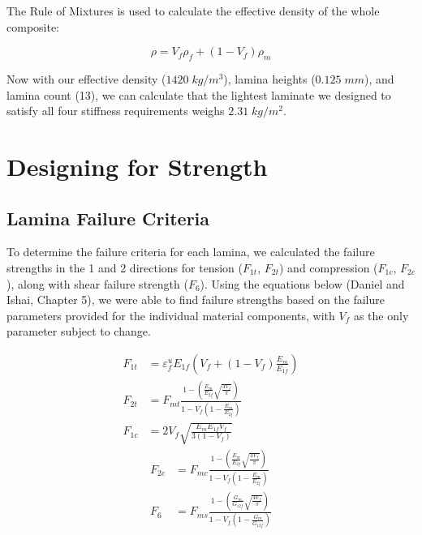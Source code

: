 \documentclass[12pt]{article}
\begin{document}
The Rule of Mixtures is used to calculate the effective density of the whole composite:

\begin{equation*}
    \rho = V_f \rho _f + (1-V_f) \rho_m
\end{equation*}

\begin{framed}
Now with our effective density ($1420 \; kg/m^3$), lamina heights ($0.125\;mm$), and lamina count (13), we can calculate that the lightest laminate we designed to satisfy all four stiffness requirements weighs $2.31\;kg/m^2$.
    
\end{framed}

\section{Designing for Strength}
\label{sec:strength}

\subsection{Lamina Failure Criteria}

To determine the failure criteria for each lamina, we calculated the failure strengths in the 1 and 2 directions for tension ($F_{1t}$, $F_{2t}$) and compression ($F_{1c}$, $F_{2c}$), along with shear failure strength ($F_6$). Using the equations below (Daniel and Ishai, Chapter 5), we were able to find failure strengths based on the failure parameters provided for the individual material components, with $V_f$ as the only parameter subject to change.

\begin{multicols}{2}
\begin{align}
    F_{1t} &= \varepsilon_{f}^{u}E_{1f}\left(V_f+(1-V_f)\frac{E_m}{E_{1f}}\right)\\
    F_{2t} &= F_{mt} \frac{1-\left( \frac{E_m}{E_{2f}}\sqrt{\frac{4V_f}{\pi}} \right)}{1-V_f\left(1-\frac{E_m}{E_{2f}}\right)}\\
    F_{1c} &= 2V_f\sqrt{\frac{E_mE_{1f}V_f}{3(1-V_f)}}
\end{align}
\begin{align}
    F_{2c} &= F_{mc} \frac{1-\left( \frac{E_m}{E_{2f}}\sqrt{\frac{4V_f}{\pi}} \right)}{1-V_f\left(1-\frac{E_m}{E_{2f}}\right)}\\ 
    F_6 &= F_{ms} \frac{1-\left( \frac{G_m}{G_{12f}}\sqrt{\frac{4V_f}{\pi}} \right)}{1-V_f\left(1-\frac{G_m}{G_{12f}}\right)}
\end{align}
\end{multicols}
\end{document}
